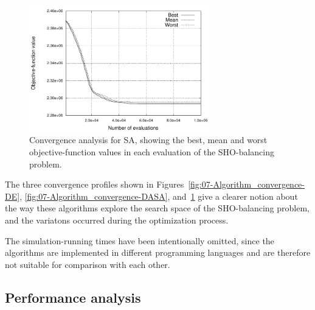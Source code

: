 \begin{figure}[h]
\centering

\includegraphics[width=0.7\textwidth]{07-experimental_evaluation-sho_balancing/img/SA_convergence}

\caption{Convergence analysis for SA, showing the best, mean and worst objective-function
values in each evaluation of the SHO-balancing problem.\label{fig:07-Algorithm_convergence-SA}}
\end{figure}


The three convergence profiles shown in Figures~\ref{fig:07-Algorithm_convergence-DE},
\ref{fig:07-Algorithm_convergence-DASA}, and~\ref{fig:07-Algorithm_convergence-SA}
give a clearer notion about the way these algorithms explore the search
space of the SHO-balancing problem, and the variatons occurred during
the optimization process.

The simulation-running times have been intentionally omitted, since
the algorithms are implemented in different programming languages
and are therefore not suitable for comparison with each other.


\subsection{Performance analysis}


